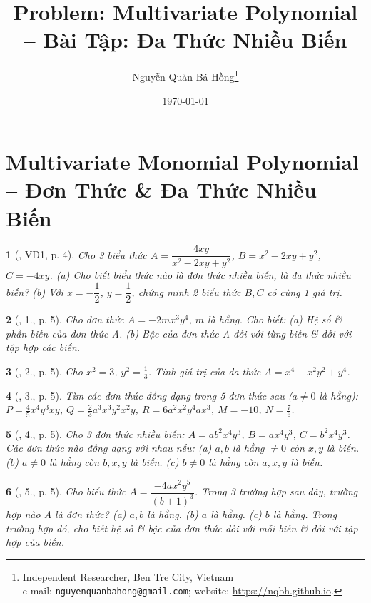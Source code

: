 \documentclass{article}
\title{Problem: Multivariate Polynomial -- Bài Tập: Đa Thức Nhiều Biến}
\author{Nguyễn Quản Bá Hồng\footnote{Independent Researcher, Ben Tre City, Vietnam\\e-mail: \texttt{nguyenquanbahong@gmail.com}; website: \url{https://nqbh.github.io}.}}
\date{\today}
\newtheorem{baitoan}{}
\begin{document}
\maketitle
\tableofcontents


\section{Multivariate Monomial Polynomial -- Đơn Thức \& Đa Thức Nhiều Biến}

\begin{baitoan}[\cite{Tuyen_Toan_8}, VD1, p. 4]
	Cho 3 biểu thức $A = \dfrac{4xy}{x^2 - 2xy + y^2}$, $B = x^2 - 2xy + y^2$, $C = -4xy$. (a) Cho biết biểu thức nào là đơn thức nhiều biến, là đa thức nhiều biến? (b) Với $x = -\dfrac{1}{2}$, $y = \dfrac{1}{2}$, chứng minh 2 biểu thức $B,C$ có cùng 1 giá trị.
\end{baitoan}

\begin{baitoan}[\cite{Tuyen_Toan_8}, 1., p. 5]
	Cho đơn thức $A = -2mx^3y^4$, $m$ là hằng. Cho biết: (a) Hệ số \& phần biến của đơn thức A. (b) Bậc của đơn thức A đối với từng biến \& đối với tập hợp các biến.
\end{baitoan}

\begin{baitoan}[\cite{Tuyen_Toan_8}, 2., p. 5]
	Cho $x^2 = 3$, $y^2 = \frac{1}{3}$. Tính giá trị của đa thức $A = x^4 - x^2y^2 + y^4$.
\end{baitoan}

\begin{baitoan}[\cite{Tuyen_Toan_8}, 3., p. 5]
	Tìm các đơn thức đồng dạng trong 5 đơn thức sau ($a\ne0$ là hằng): $P = \frac{4}{5}x^4y^3xy$, $Q = \frac{2}{3}a^3x^3y^2x^2y$, $R = 6a^2x^2y^4ax^3$, $M = -10$, $N = \frac{7}{6}$.
\end{baitoan}

\begin{baitoan}[\cite{Tuyen_Toan_8}, 4., p. 5]
	Cho 3 đơn thức nhiều biến: $A = ab^2x^4y^3$, $B = ax^4y^3$, $C = b^2x^4y^3$. Các đơn thức nào đồng dạng với nhau nếu: (a) $a,b$ là hằng $\ne0$ còn $x,y$ là biến. (b) $a\ne0$ là hằng còn $b,x,y$ là biến. (c) $b\ne0$ là hằng còn $a,x,y$ là biến.
\end{baitoan}

\begin{baitoan}[\cite{Tuyen_Toan_8}, 5., p. 5]
	Cho biểu thức $A = \dfrac{-4ax^2y^5}{(b + 1)^3}$. Trong 3 trường hợp sau đây, trường hợp nào A là đơn thức? (a) $a,b$ là hằng. (b) $a$ là hằng. (c) $b$ là hằng. Trong trường hợp đó, cho biết hệ số \& bậc của đơn thức đối với mỗi biến \& đối với tập hợp của biến.
\end{baitoan}
\end{document}
